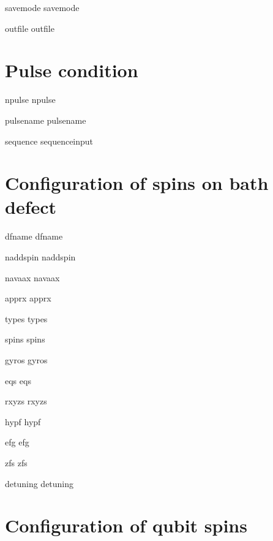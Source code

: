 \begin{DoxyItemize}
\item savemode savemode
\item outfile outfile
\end{DoxyItemize}\hypertarget{TagVariable_IN_PULSE}{}\section{Pulse condition}\label{TagVariable_IN_PULSE}

\begin{DoxyItemize}
\item npulse npulse
\item pulsename pulsename
\item sequence sequenceinput
\end{DoxyItemize}\hypertarget{TagVariable_IN_DEFECTARR}{}\section{Configuration of spins on bath defect}\label{TagVariable_IN_DEFECTARR}

\begin{DoxyItemize}
\item dfname dfname
\item naddspin naddspin
\item navaax navaax
\item apprx apprx
\item types types
\item spins spins
\item gyros gyros
\item eqs eqs
\item rxyzs rxyzs
\item hypf hypf
\item efg efg
\item zfs zfs
\item detuning detuning
\end{DoxyItemize}\hypertarget{TagVariable_IN_QUBITARR}{}\section{Configuration of qubit spins}\label{TagVariable_IN_QUBITARR}

